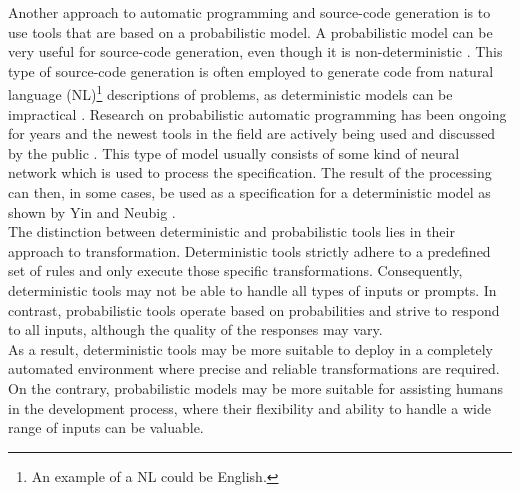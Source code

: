 Another approach to automatic programming and source-code generation is to use tools that are based on a probabilistic model.
A probabilistic model can be very useful for source-code generation, even though it is non-deterministic \cite{chenEvaluatingLargeLanguage2021}.
This type of source-code generation is often employed to generate code from natural language (NL)\footnote{
    An example of a NL could be English.
}
descriptions of problems, as deterministic models can be impractical \cite{alonStructuralLanguageModels2020}.
Research on probabilistic automatic programming has been ongoing for years and the newest tools in the field are actively being used and discussed by the public \cite{WhatChatGPTWhy, johnmaedaChoosingLLMModel2023}.
This type of model usually consists of some kind of neural network which is used to process the specification. 
The result of the processing can then, in some cases, be used as a specification for a deterministic model as shown by Yin and Neubig \cite{yinSyntacticNeuralModel2017}.\\
The distinction between deterministic and probabilistic tools lies in their approach to transformation. Deterministic tools strictly adhere to a predefined set of rules and only execute those specific transformations. Consequently, deterministic tools may not be able to handle all types of inputs or prompts.
In contrast, probabilistic tools operate based on probabilities and strive to respond to all inputs, although the quality of the responses may vary.\\
As a result, deterministic tools may be more suitable to deploy in a completely automated environment where precise and reliable transformations are required.
On the contrary, probabilistic models may be more suitable for assisting humans in the development process, where their flexibility and ability to handle a wide range of inputs can be valuable.